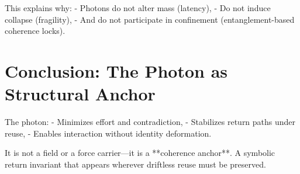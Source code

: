 This explains why:
- Photons do not alter mass (latency),
- Do not induce collapse (fragility),
- And do not participate in confinement (entanglement-based coherence locks).

\section{Conclusion: The Photon as Structural Anchor} \label{sec:photon-conclusion}

The photon:
- Minimizes effort and contradiction,
- Stabilizes return paths under reuse,
- Enables interaction without identity deformation.

It is not a field or a force carrier—it is a **coherence anchor**. A symbolic return invariant that appears wherever driftless reuse must be preserved.

